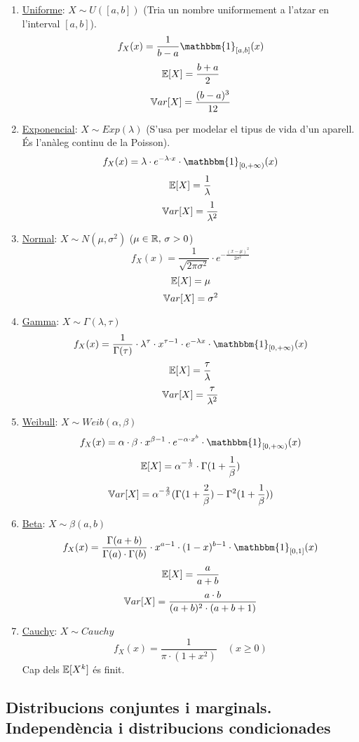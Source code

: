 \begin{enumerate}
    \item \underline{Uniforme}: $X \sim U([a,b])$ \quad (Tria un nombre uniformement a l'atzar en l'interval $[a,b]$). \\
    \[
      f_{X}(x)=\frac{1}{b-a}\mathbbm{1}_{[a,b]}(x)
    \]
    \[
      \mathbb{E}[X]=\frac{b+a}{2}
    \]
    \[
      \mathbb{V} ar[X]=\frac{(b-a)^{3}}{12}
    \]
    \item \underline{Exponencial}: $X\sim Exp(\lambda)$ \quad (S'usa per modelar el tipus de vida 
    d'un aparell. És l'anàleg continu de la Poisson).
    \[
      f_{X}(x)=\lambda\cdot e^{-\lambda\cdot x}\cdot \mathbbm{1}_{[0,+\infty)}(x)
    \]
    \[
      \mathbb{E}[X]=\frac{1}{\lambda}
    \]
    \[
      \mathbb{V} ar[X]=\frac{1}{\lambda^{2}}
    \]
    \item \underline{Normal}: $X\sim N(\mu, \sigma^{2})$ \quad ($\mu \in \mathbb{R}, \, \sigma > 0$)
    \[
      f_{X}(x)=\frac{1}{\sqrt{2\pi\sigma^{2}}}\cdot e^{-\frac{(x-\mu)^{2}}{2\sigma^{2}}}
    \]
    \[
      \mathbb{E}[X]=\mu
    \]
    \[
      \mathbb{V} ar[X]=\sigma^{2}
    \]
    \item \underline{Gamma}: $X \sim \Gamma(\lambda, \tau)$
    \[
      f_{X}(x)=\frac{1}{\Gamma(\tau)}\cdot \lambda^{\tau}\cdot x^{\tau -1}\cdot e^{-\lambda x}\cdot 
      \mathbbm{1}_{[0,+\infty)}(x)
    \]
    \[
      \mathbb{E}[X]=\frac{\tau}{\lambda}
    \]
    \[
      \mathbb{V} ar[X]=\frac{\tau}{\lambda^{2}}
    \]
    \item \underline{Weibull}: $X\sim Weib(\alpha, \beta)$
    \[
      f_{X}(x)=\alpha\cdot \beta \cdot x^{\beta-1}\cdot e^{-\alpha\cdot x^{b}}\cdot \mathbbm{1}_{[0,+\infty)}(x)
    \]
    \[
      \mathbb{E}[X]=\alpha^{-\frac{1}{\beta}}\cdot \Gamma(1+\frac{1}{\beta})
    \]
    \[
      \mathbb{V} ar[X]=\alpha^{-\frac{2}{\beta}}(\Gamma(1+\frac{2}{\beta})-\Gamma^{2}(1+\frac{1}{\beta}))
    \]
    \item \underline{Beta}: $X\sim \beta(a,b)$
    \[
      f_{X}(x)=\frac{\Gamma(a+b)}{\Gamma(a)\cdot \Gamma(b)}\cdot x^{a-1}\cdot (1-x)^{b-1}\cdot \mathbbm{1}_{[0,1]}(x)
    \]
    \[
      \mathbb{E}[X]=\frac{a}{a+b}
    \]
    \[
      \mathbb{V} ar[X]=\frac{a\cdot b}{(a+b)^{2}\cdot (a+b+1)}
    \]
    \item \underline{Cauchy}: $X\sim Cauchy$
    \[
      f_{X}(x)=\frac{1}{\pi\cdot (1+x^{2})} \quad (x \geq 0)
    \]
     \quad Cap dels $\mathbb{E}[X^{k}]$ és finit.
\end{enumerate}

\subsection{Distribucions conjuntes i marginals. Independència i distribucions condicionades}

